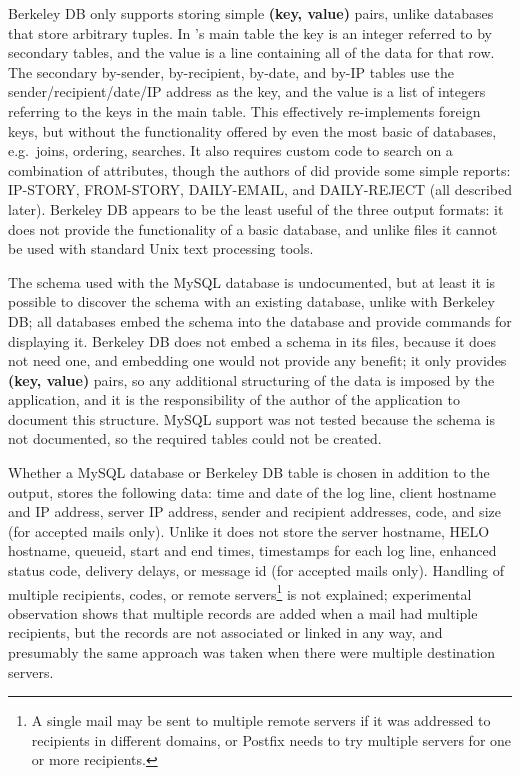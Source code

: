 Berkeley DB only supports storing simple \textbf{(key, value)} pairs,
unlike  databases that store arbitrary tuples.  In
's main table the key is an integer referred to by secondary
tables, and the value is a  line containing all of the data
for that row.  The secondary by-sender, by-recipient, by-date, and by-IP
tables use the sender/recipient/date/IP address as the key, and the value
is a  list of integers referring to the keys in the main
table.  This effectively re-implements  foreign keys, but
without the functionality offered by even the most basic of 
databases, e.g.\ joins, ordering, searches.  It also requires custom code
to search on a combination of attributes, though the authors of
 did provide some simple reports: IP-STORY, FROM-STORY,
DAILY-EMAIL, and DAILY-REJECT (all described later).  Berkeley DB appears
to be the least useful of the three output formats: it does not provide the
functionality of a basic  database, and unlike 
files it cannot be used with standard Unix text processing tools.

The schema used with the MySQL database is undocumented, but at least it is
possible to discover the schema with an existing  database,
unlike with Berkeley DB\@; all  databases embed the schema
into the database and provide commands for displaying it.  Berkeley DB does
not embed a schema in its files, because it does not need one, and
embedding one would not provide any benefit; it only provides \textbf{(key,
value)} pairs, so any additional structuring of the data is imposed by the
application, and it is the responsibility of the author of the application
to document this structure.  MySQL support was not tested because the
schema is not documented, so the required tables could not be created.

Whether a MySQL database or Berkeley DB table is chosen in addition to the
 output,  stores the following data: time and
date of the log line, client hostname and IP address, server IP address,
sender and recipient addresses,  code, and size (for accepted
mails only).  Unlike \parsername{} it does not store the server hostname,
HELO hostname, queueid, start and end times, timestamps for each log line,
enhanced status code, delivery delays, or message id (for accepted mails
only).  Handling of multiple recipients,  codes, or remote
servers\footnote{A single mail may be sent to multiple remote servers if it
was addressed to recipients in different domains, or Postfix needs to try
multiple servers for one or more recipients.} is not explained;
experimental observation shows that multiple records are added when a mail
had multiple recipients, but the records are not associated or linked in
any way, and presumably the same approach was taken when there were
multiple destination servers.

